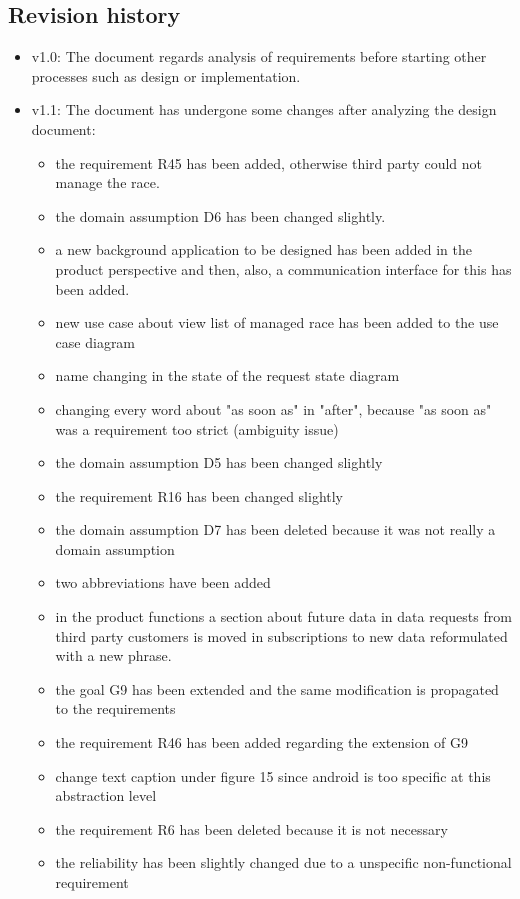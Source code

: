 \subsection{Revision history}
\begin{itemize}
\item v1.0: The document regards analysis of requirements before starting other processes such as design or implementation.
\item v1.1: The document has undergone some changes after analyzing the design document:
	\begin{itemize}
	\item the requirement R45 has been added, otherwise third party could not manage the race.
	\item the domain assumption D6 has been changed slightly.
	\item a new background application to be designed has been added in the product perspective and then, also, a communication interface for this has been added.
	\item new use case about view list of managed race has been added to the use case diagram 
	\item name changing in the state of the request state diagram
	\item changing every word about "as soon as" in "after", because "as soon as" was a requirement too strict (ambiguity issue)
	\item the domain assumption D5 has been changed slightly
	\item the requirement R16 has been changed slightly
	\item the domain assumption D7 has been deleted because it was not really a domain assumption
	\item two abbreviations have been added
	\item in the product functions a section about future data in data requests from third party customers is moved in subscriptions to new data reformulated with a new phrase.
	\item the goal G9 has been extended and the same modification is propagated to the requirements
	\item the requirement R46 has been added regarding the extension of G9
	\item change text caption under figure 15 since android is too specific at this abstraction level
	\item the requirement R6 has been deleted because it is not necessary
	\item the reliability has been slightly changed due to a unspecific non-functional requirement

\end{itemize}
\end{itemize}

